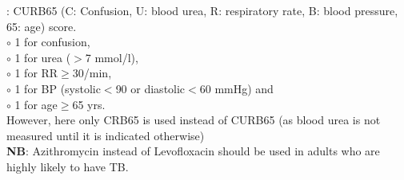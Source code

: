 \documentclass[11pt,a4paper]{report}
\begin{document}
: CURB65 (C: Confusion, U: blood urea, R: respiratory rate, B: blood pressure, 65: age) score.\\
{\color{red}$\circ$} 1 for confusion, \\
{\color{red}$\circ$} 1 for urea ($>$7 mmol/l), \\
{\color{red}$\circ$} 1 for RR$\geq$30/min, \\
{\color{red}$\circ$} 1 for BP (systolic$<$90 or diastolic$<$60 mmHg) and \\
{\color{red}$\circ$} 1 for age$\geq$65 yrs. \\
However, here only CRB65 is used instead of CURB65 (as blood urea is not measured until it is indicated otherwise)\\
\textbf{NB}: Azithromycin instead of Levofloxacin should be used in adults who are highly likely to have TB. 
\end{document}
